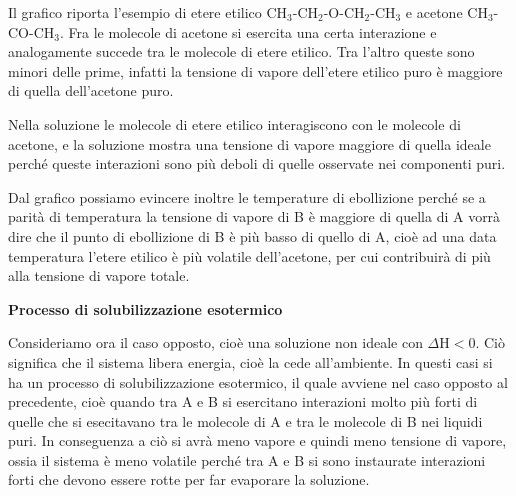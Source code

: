 \vspace{0.2cm}Il grafico riporta l'esempio di etere etilico CH$_3$-CH$_2$-O-CH$_2$-CH$_3$ e acetone CH$_3$-CO-CH$_3$. Fra le molecole di acetone si esercita una certa interazione e analogamente succede tra le molecole di etere etilico. Tra l'altro queste sono minori delle prime, infatti la tensione di vapore dell'etere etilico puro è maggiore di quella dell'acetone puro.

Nella soluzione le molecole di etere etilico interagiscono con le molecole di acetone, e la soluzione mostra una tensione di vapore maggiore di quella ideale perché queste interazioni sono più deboli di quelle osservate nei componenti puri.

Dal grafico possiamo evincere inoltre le temperature di ebollizione perché se a parità di temperatura la tensione di vapore di B è maggiore di quella di A vorrà dire che il punto di ebollizione di B è più basso di quello di A, cioè ad una data temperatura l'etere etilico è più volatile dell'acetone, per cui contribuirà di più alla tensione di vapore totale.

\vspace{0.2cm}\textbf{Processo di solubilizzazione esotermico}

Consideriamo ora il caso opposto, cioè una soluzione non ideale con $\Delta$H$<$0. Ciò significa che il sistema libera energia, cioè la cede all'ambiente. In questi casi si ha un processo di solubilizzazione esotermico, il quale avviene nel caso opposto al precedente, cioè quando tra A e B si esercitano interazioni molto più forti di quelle che si esecitavano tra le molecole di A e tra le molecole di B nei liquidi puri. In conseguenza a ciò si avrà meno vapore e quindi meno tensione di vapore, ossia il sistema è meno volatile perché tra A e B si sono instaurate interazioni forti che devono essere rotte per far evaporare la soluzione.

